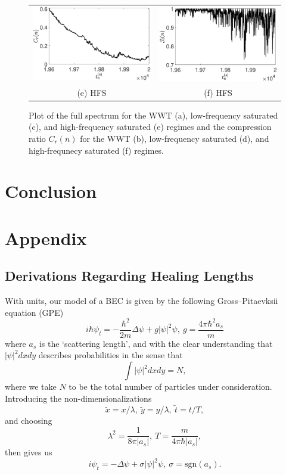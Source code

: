 \documentclass[aps,prl,preprint,groupedaddress]{revtex4-1}
\begin{document}
\begin{figure}[!ht]
\begin{tabular}{cc}
\includegraphics[width=.525\textwidth]{cratio_hfforce_K_256_Lx_128_tf_2e4} &\hspace{-25pt} \includegraphics[width=.525\textwidth]{oratio_hfforce_K_256_Lx_128_tf_2e4}\\
(e) HFS & (f) HFS
\end{tabular}
\caption{Plot of the full spectrum for the WWT (a), low-frequency saturated (c), and high-frequency saturated (e) regimes and the compression ratio $C_{r}(n)$ for the WWT (b), low-frequency saturated (d), and high-frequnecy saturated (f) regimes.}
\label{fig:comprats}
\end{figure}

\section*{Conclusion}

\section*{Appendix}
\subsection*{Derivations Regarding Healing Lengths}
With units, our model of a BEC is given by the following Gross--Pitaevksii equation (GPE)
\[
i\hbar\psi_{t} = -\frac{\hbar^{2}}{2m}\Delta \psi + g\left| \psi\right|^{2}\psi, ~ g = \frac{4\pi \hbar^{2}a_{s}}{m}
\]
where $a_{s}$ is the `scattering length', and with the clear understanding that $\left|\psi\right|^{2}dxdy$ describes probabilities in the sense that 
\[
\int |\psi|^{2}dxdy = N,
\]
where we take $N$ to be the total number of particles under consideration.  Introducing the non-dimensionalizations 
\[
\tilde{x} = x/\lambda, ~ \tilde{y} = y/\lambda, ~ \tilde{t} = t/T, 
\]
and choosing
\[
\lambda^{2} = \frac{1}{8\pi |a_{s}|}, ~ T = \frac{m}{4\pi\hbar |a_{s}|}, 
\] 
then gives us
\[
i\psi_{t} = -\Delta \psi + \sigma\left| \psi\right|^{2}\psi,  ~\sigma = \mbox{sgn}(a_{s}).
\]



\end{document}
